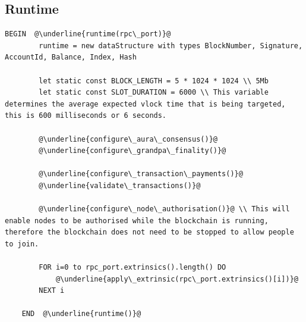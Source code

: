 \subsection{Runtime}
\begin{lstlisting}[caption=Runtime, escapechar=\@]
	BEGIN  @\underline{runtime(rpc\_port)}@
		runtime = new dataStructure with types BlockNumber, Signature, AccountId, Balance, Index, Hash

		let static const BLOCK_LENGTH = 5 * 1024 * 1024 \\ 5Mb
		let static const SLOT_DURATION = 6000 \\ This variable determines the average expected vlock time that is being targeted, this is 600 milliseconds or 6 seconds.

		@\underline{configure\_aura\_consensus()}@
		@\underline{configure\_grandpa\_finality()}@

		@\underline{configure\_transaction\_payments()}@
		@\underline{validate\_transactions()}@

		@\underline{configure\_node\_authorisation()}@ \\ This will enable nodes to be authorised while the blockchain is running, therefore the blockchain does not need to be stopped to allow people to join.

		FOR i=0 to rpc_port.extrinsics().length() DO
			@\underline{apply\_extrinsic(rpc\_port.extrinsics()[i])}@
		NEXT i

	END  @\underline{runtime()}@
\end{lstlisting}
